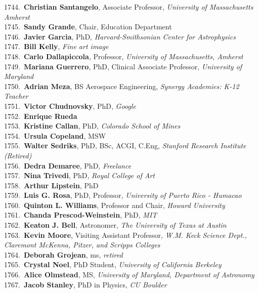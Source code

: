 1744.~{\bf Christian Santangelo}, Associate Professor, {\sl University of Massachusetts Amherst} \\
1745.~{\bf Sandy Grande}, Chair, Education Department \\
1746.~{\bf Javier Garcia}, PhD, {\sl Harvard-Smithsonian Center for Astrophysics} \\
1747.~{\bf Bill Kelly}, {\sl Fine art image} \\
1748.~{\bf Carlo Dallapiccola}, Professor, {\sl University of Massachusetts, Amherst} \\
1749.~{\bf Mariana Guerrero}, PhD, Clinical Associate Professor, {\sl University of Maryland} \\
1750.~{\bf Adrian Meza}, BS Aerospace Engineering, {\sl Synergy Academies: K-12 Teacher} \\
1751.~{\bf Victor Chudnovsky}, PhD, {\sl Google} \\
1752.~{\bf Enrique Rueda} \\
1753.~{\bf Kristine Callan}, PhD, {\sl Colorado School of Mines} \\
1754.~{\bf Ursula Copeland}, MSW \\
1755.~{\bf Walter Sedriks}, PhD, BSc, ACGI, C.Eng, {\sl Stanford Research Institute (Retired)} \\
1756.~{\bf Dedra Demaree}, PhD, {\sl Freelance} \\
1757.~{\bf Nina Trivedi}, PhD, {\sl Royal College of Art } \\
1758.~{\bf Arthur Lipstein}, PhD \\
1759.~{\bf Luis G. Rosa}, PhD, Professor, {\sl University of Puerto Rico - Humacao} \\
1760.~{\bf Quinton L. Williams}, Professor and Chair, {\sl Howard University} \\
1761.~{\bf Chanda Prescod-Weinstein}, PhD, {\sl MIT} \\
1762.~{\bf Keaton J. Bell}, Astronomer, {\sl The University of Texas at Austin} \\
1763.~{\bf Kevin Moore}, Visiting Assistant Professor, {\sl W.M. Keck Science Dept., Claremont McKenna, Pitzer, and Scripps Colleges} \\
1764.~{\bf Deborah Grojean}, ms, {\sl retired} \\
1765.~{\bf Crystal Noel}, PhD Student, {\sl University of California Berkeley } \\
1766.~{\bf Alice Olmstead}, MS, {\sl University of Maryland, Department of Astronomy} \\
1767.~{\bf Jacob Stanley}, PhD in Physics, {\sl CU Boulder} \\
